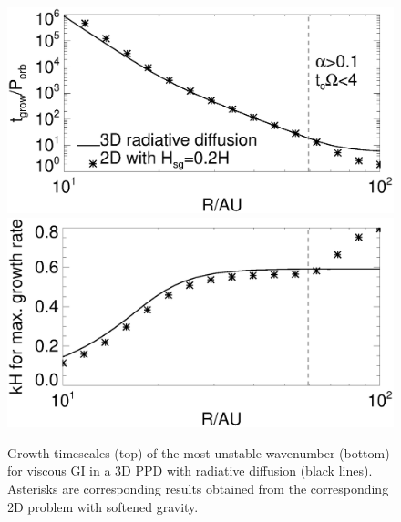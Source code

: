 \begin{figure}
  \includegraphics[width=\linewidth,clip=true,trim=0cm 2cm 0cm
    0.0cm]{figures/ppd_3d_rates}\\
  \includegraphics[width=\linewidth,clip=true,trim=0cm 0cm 0cm
    0.8cm]{figures/ppd_3d_maxk}
  \caption{Growth timescales (top) of the most unstable
    wavenumber (bottom) for viscous GI in a 3D PPD with radiative
    diffusion  (black lines). Asterisks are corresponding results
    obtained from the corresponding 2D problem with softened gravity.   
    \label{rafikov_growth3d}}
\end{figure}



